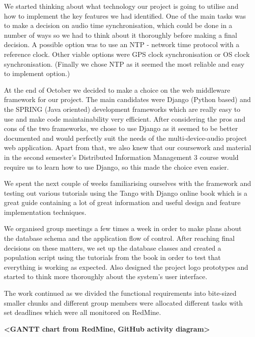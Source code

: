 \documentclass{l3proj}
\begin{document}
We started thinking about what technology our project is going to utilise and how to implement the key features we had identified. One of the main tasks was to make a decision on audio time synchronisation, which could be done in a number of ways so we had to think about it thoroughly before making a final decision. A possible option was to use an NTP - network time protocol with a reference clock. Other viable options were GPS clock synchronisation or OS clock synchronisation. (Finally we chose NTP as it seemed the most reliable and easy to implement option.)

At the end of October we decided to make a choice on the web middleware framework for our project. The main candidates were Django (Python based) and the SPRING (Java oriented) development frameworks which are really easy to use and make code maintainability very efficient. After considering the pros and cons of the two frameworks, we chose to use Django as it seemed to be better documented and would perfectly suit the needs of the multi-device-audio project web application. Apart from that, we also knew that our coursework and material in the second semester’s Distributed Information Management 3 course would require us to learn how to use Django, so this made the choice even easier.

We spent the next couple of weeks familiarising ourselves with the framework and testing out various tutorials using the Tango with Django online book which is a great guide containing a lot of great information and useful design and feature implementation techniques.

We organised group meetings a few times a week in order to make plans about the database schema and the application flow of control. After reaching final decisions on these matters, we set up the database classes and created a population script using the tutorials from the book in order to test that everything is working as expected. Also designed the project logo prototypes and started to think more thoroughly about the system’s user interface.

The work continued as we divided the functional requirements into bite-sized smaller chunks and different group members were allocated different tasks with set deadlines which were all monitored on RedMine.

\textbf{<GANTT chart from RedMine, GitHub activity diagram>}




\end{document}
